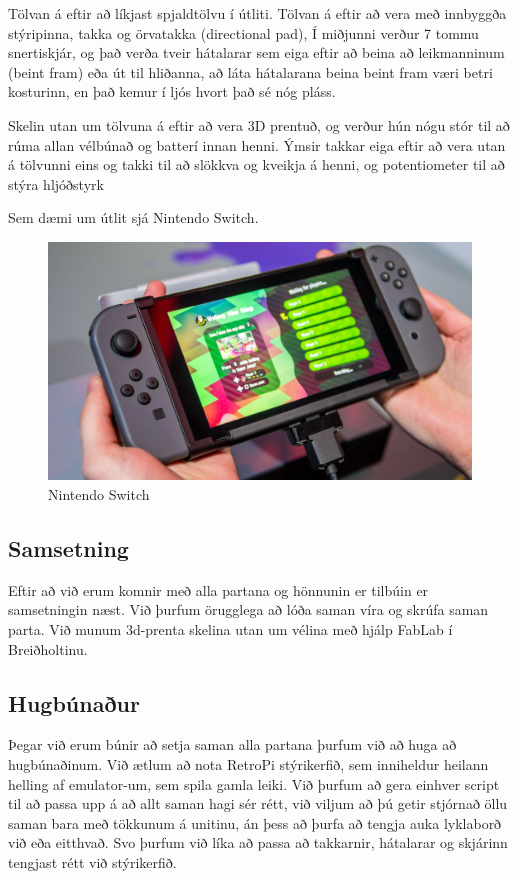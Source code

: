 Tölvan á eftir að líkjast spjaldtölvu í útliti. Tölvan á eftir að vera með innbyggða stýripinna, takka og örvatakka (directional pad), Í miðjunni verður 7 tommu snertiskjár, og það verða tveir hátalarar sem eiga eftir að beina að leikmanninum (beint fram) eða út til hliðanna, að láta hátalarana beina beint fram væri betri kosturinn, en það kemur í ljós hvort það sé nóg pláss.

Skelin utan um tölvuna á eftir að vera 3D prentuð, og verður hún nógu stór til að rúma allan vélbúnað og batterí innan henni. Ýmsir takkar eiga eftir að vera utan á tölvunni eins og takki til að slökkva og kveikja á henni, og potentiometer til að stýra hljóðstyrk

Sem dæmi um útlit sjá Nintendo Switch.

\begin{figure}[h]
	\centering
	\includegraphics[scale=.5]{img/switch}
	\caption{Nintendo Switch}
\end{figure}

\subsection{Samsetning}

Eftir að við erum komnir með alla partana og hönnunin er tilbúin er samsetningin næst. Við þurfum örugglega að lóða saman víra og skrúfa saman parta. Við munum 3d-prenta skelina utan um vélina með hjálp FabLab í Breiðholtinu. \cite{retroWiki}

\subsection{Hugbúnaður}

Þegar við erum búnir að setja saman alla partana þurfum við að huga að hugbúnaðinum. Við ætlum að nota RetroPi stýrikerfið, sem inniheldur heilann helling af emulator-um, sem spila gamla leiki. Við þurfum að gera einhver script til að passa upp á að allt saman hagi sér rétt, við viljum að þú getir stjórnað öllu saman bara með tökkunum á unitinu, án þess að þurfa að tengja auka lyklaborð við eða eitthvað. Svo þurfum við líka að passa að takkarnir, hátalarar og skjárinn tengjast rétt við stýrikerfið. \cite{alexB}

